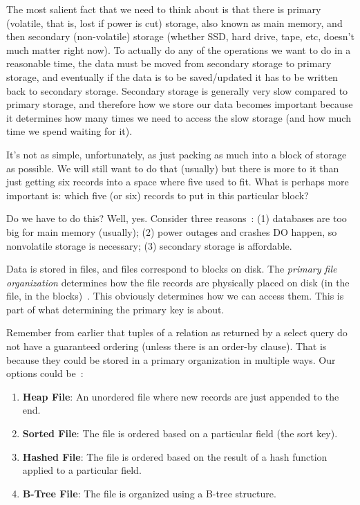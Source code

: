 \documentclass[a4paper]{report}
\begin{document}
The most salient fact that we need to think about is that there is primary (volatile, that is, lost if power is cut) storage, also known as main memory, and then secondary (non-volatile) storage (whether SSD, hard drive, tape, etc, doesn't much matter right now). To actually do any of the operations we want to do in a reasonable time, the data must be moved from secondary storage to primary storage, and eventually if the data is to be saved/updated it has to be written back to secondary storage. Secondary storage is generally very slow compared to primary storage, and therefore how we store our data becomes important because it determines how many times we need to access the slow storage (and how much time we spend waiting for it). 

It's not as simple, unfortunately, as just packing as much into a block of storage as possible. We will still want to do that (usually) but there is more to it than just getting six records into a space where five used to fit. What is perhaps more important is: which five (or six) records to put in this particular block?

Do we have to do this? Well, yes. Consider three reasons~\cite{fds}: (1) databases are too big for main memory (usually); (2) power outages and crashes DO happen, so nonvolatile storage is necessary; (3) secondary storage is affordable.

Data is stored in files, and files correspond to blocks on disk. The \textit{primary file organization} determines how the file records are physically placed on disk (in the file, in the blocks)~\cite{fds}. This obviously determines how we can access them. This is part of what determining the primary key is about. 

Remember from earlier that tuples of a relation as returned by a select query do not have a guaranteed ordering (unless there is an order-by clause). That is because they could be stored in a primary organization in multiple ways. Our options could be~\cite{fds}:

\begin{enumerate}
	\item \textbf{Heap File}: An unordered file where new records are just appended to the end.
	\item \textbf{Sorted File}: The file is ordered based on a particular field (the sort key).
	\item \textbf{Hashed File}: The file is ordered based on the result of a hash function applied to a particular field.
	\item \textbf{B-Tree File}: The file is organized using a B-tree structure.
\end{enumerate}
\end{document}
